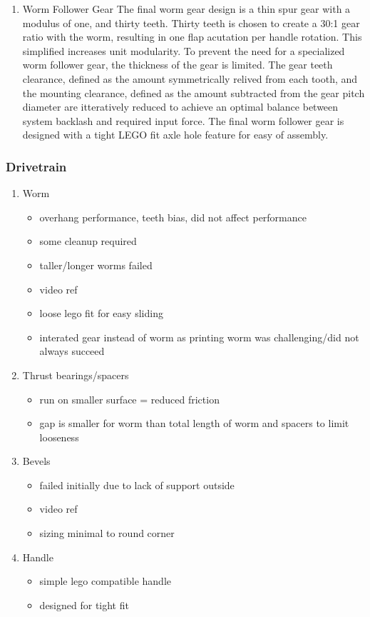 \documentclass[11pt]{article}
\begin{document}
\begin{enumerate}
\item Worm Follower Gear
\label{sec:org5b580e1}
The final worm gear design is a thin spur gear with a modulus of one, and thirty teeth. Thirty teeth is chosen to create a 30:1 gear ratio with the worm, resulting in one flap acutation per handle rotation. This simplified increases unit modularity. To prevent the need for a specialized worm follower gear, the thickness of the gear is limited. The gear teeth clearance, defined as the amount symmetrically relived from each tooth, and the mounting clearance, defined as the amount subtracted from the gear pitch diameter are itteratively reduced to achieve an optimal balance between system backlash and required input force. The final worm follower gear is designed with a tight LEGO fit axle hole feature for easy of assembly.
\end{enumerate}

\subsubsection{Drivetrain}
\label{sec:org11bcf12}

\begin{enumerate}
\item Worm
\label{sec:orgb443f4c}
\begin{itemize}
\item overhang performance, teeth bias, did not affect performance
\item some cleanup required
\item taller/longer worms failed
\item video ref
\item loose lego fit for easy sliding
\item interated gear instead of worm as printing worm was challenging/did not always succeed
\end{itemize}

\item Thrust bearings/spacers
\label{sec:org85135ed}
\begin{itemize}
\item run on smaller surface = reduced friction
\item gap is smaller for worm than total length of worm and spacers to limit looseness
\end{itemize}

\item Bevels
\label{sec:org1e1236f}
\begin{itemize}
\item failed initially due to lack of support outside
\item video ref
\item sizing minimal to round corner
\end{itemize}

\item Handle
\label{sec:orgbaa630d}
\begin{itemize}
\item simple lego compatible handle
\item designed for tight fit
\end{itemize}
\end{enumerate}
\end{document}
